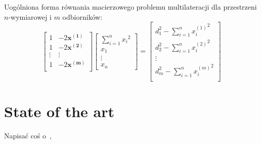 Uogólniona forma równania macierzowego problemu multilateracji dla przestrzeni $n$-wymiarowej i $m$ odbiorników:
\begin{equation}
    \left[
        \begin{matrix}
            1 & -2\boldsymbol{x^{(1)}}\\
            1 & -2\boldsymbol{x^{(2)}}\\
            \vdots & \vdots\\
            1 & -2\boldsymbol{x^{(m)}}\\
        \end{matrix}
    \right]
    \left[
        \begin{matrix}
            \sum_{i=1}^{n}{x_i}^2\\
            x_1\\
            \vdots\\
            x_n
        \end{matrix}
    \right]
    =
    \left[
        \begin{matrix}
            d_1^2 - \sum_{i=1}^{n}{x_i^{(1)}}^2\\
            d_2^2 - \sum_{i=1}^{n}{x_i^{(2)}}^2\\
            \vdots\\
            d_m^2 - \sum_{i=1}^{n}{x_i^{(m)}}^2\\
        \end{matrix}
    \right]
\end{equation}


\section{State of the art}

Napisać coś o~\cite{murphy1995determination},\cite{norrdine2012algebraic}
